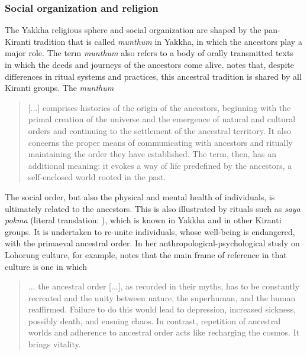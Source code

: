 \subsubsection{Social organization and religion}\label{social}

The Yakkha religious sphere and social organization are shaped by the pan-Kiranti tradition that is called \emph{munthum} in Yakkha, in which the ancestors play a major role. The term \emph{munthum} also refers to a body of orally transmitted texts in which the deeds and journeys of the ancestors come alive. \citet{Gaenszle_Redefining} notes that, despite differences in ritual systems and practices, this ancestral tradition is shared by  all Kiranti groups. The \emph{munthum}

\begin{quote}
[...] comprises histories of the origin of the ancestors, beginning with the primal creation of the universe and the emergence of natural and cultural orders and continuing to the settlement of the ancestral territory. It also concerns the proper means of communicating with ancestors and ritually maintaining the order they have established. The term, then, has an additional meaning: it evokes a way of life predefined by the ancestors, a self-enclosed world rooted in the past. \citep[224]{Gaenszle2000Origins}
\end{quote}

The social order, but also the physical and mental health of individuals, is ultimately related to the ancestors. This is also illustrated by rituals such as \emph{saya pokma} (literal translation: ), which is known in Yakkha and in other Kiranti groups. It is undertaken to re-unite individuals, whose well-being is endangered, with the primaeval ancestral order. In her anthropological-psychological study on Lohorung culture, for example, \citet{Hardman2000_Other} notes that the main frame of reference in that culture is one in which

\begin{quote}
... the  ancestral order [...], as recorded in their myths, has to be constantly recreated and the unity between nature, the superhuman, and the human reaffirmed. Failure to do this would lead to depression, increased sickness, possibly death, and ensuing chaos. In contrast, repetition of ancestral worlds and adherence to ancestral order acts like recharging the cosmos. It brings vitality. \citep[12--3]{Hardman2000_Other}
\end{quote}

